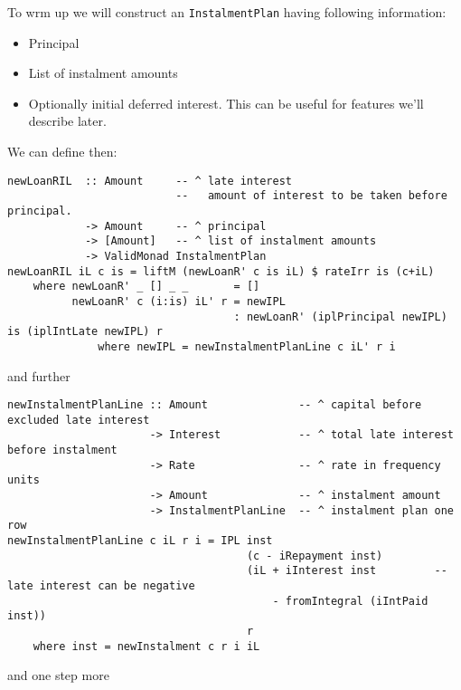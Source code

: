 \documentclass[letterpaper,11pt]{article}
\begin{document}
To wrm up we will construct an {\tt InstalmentPlan} having following information:
\begin{itemize}
\item Principal
\item List of instalment amounts
    \item Optionally initial deferred interest. This can be useful for features we'll describe later.
\end{itemize}

We can define then:
{\small
\begin{verbatim}
newLoanRIL  :: Amount     -- ^ late interest
                          --   amount of interest to be taken before principal.
            -> Amount     -- ^ principal
            -> [Amount]   -- ^ list of instalment amounts
            -> ValidMonad InstalmentPlan
newLoanRIL iL c is = liftM (newLoanR' c is iL) $ rateIrr is (c+iL)
    where newLoanR' _ [] _ _       = []
          newLoanR' c (i:is) iL' r = newIPL
                                   : newLoanR' (iplPrincipal newIPL) is (iplIntLate newIPL) r
              where newIPL = newInstalmentPlanLine c iL' r i
\end{verbatim}
}

and further

{\small
\begin{verbatim}
newInstalmentPlanLine :: Amount              -- ^ capital before excluded late interest
                      -> Interest            -- ^ total late interest before instalment
                      -> Rate                -- ^ rate in frequency units
                      -> Amount              -- ^ instalment amount
                      -> InstalmentPlanLine  -- ^ instalment plan one row
newInstalmentPlanLine c iL r i = IPL inst
                                     (c - iRepayment inst)
                                     (iL + iInterest inst         -- late interest can be negative
                                         - fromIntegral (iIntPaid inst))
                                     r
    where inst = newInstalment c r i iL
\end{verbatim}
}

and one step more
\end{document}
